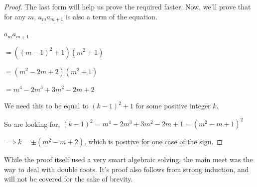 \begin{proof}
The last form will help us prove the required faster.
Now, we'll prove that for any $m$, $a_m a_{m+1}$ is also a term of the equation.\par
$a_m a_{m+1}$\par
$= ((m-1)^2+1)(m^2+1)$\par
$=(m^2-2m+2)(m^2+1)$\par
$=m^4-2m^3+3m^2-2m+2$\par
We need this to be equal to $(k-1)^2+1$ for some positive integer $k$.\par
So are looking for, $(k-1)^2=m^4-2m^3+3m^2-2m+1=(m^2-m+1)^2$\par
$\implies k=\pm (m^2-m+2)$, which is positive for one case of the sign.\par
\end{proof}
While the proof itself used a very smart algebraic solving, the main meet was the way to deal with double roots. It's proof also follows from strong induction, and will not be covered for the sake of brevity.
